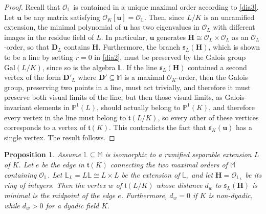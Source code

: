 \documentclass{amsart}
\newtheorem{proposition}[theorem]{Proposition}
\theoremstyle{definition}
\newcommand\lu{\mathbb{L}}
\newcommand\alge{\mathbb{M}}
\newcommand\oink{\mathcal O}
\newcommand\Da{\mathbf{D}}
\newcommand\Ha{\mathbf{H}}
\begin{document}
\begin{proof}
    Recall that $\oink_{\lu}$ is contained in
    a unique maximal order 
    according to \ref{dia3}.
    Let $\mathbf{u}$ be any matrix satisfying
    $\oink_K[\mathbf{u}]=
    \oink_{\lu}$. Then, since $L/K$
    is an unramified extension, 
    the minimal polynomial
    of $\mathbf{u}$ has two eigenvalues in 
    $\oink_L$ with different
    images in the residue field of 
    $L$. In particular,
    $\mathbf{u}$ generates 
    $\Ha\cong\oink_L\times\oink_L$ 
    as an $\oink_L$-order, 
    so that $\Da_L$ contains
    $\Ha$. Furthermore, the 
    branch $\mathfrak{s}_L(\Ha)$,
    which is shown to be a line by 
    setting $r=0$ in \ref{dia2},
    must be preserved by the Galois 
    group $\mathrm{Gal}(L/K)$,
    since so is the algebra $\lu$. If the line
    $\mathfrak{s}_L(\Ha)$ contained 
    a second vertex
    of the form
    $\Da'_L$ where $\Da'\subseteq\alge$ is a 
    maximal $\oink_K$-order, then the 
    Galois group, 
    preserving two points in a line, 
    must act trivially,
    and therefore it must preserve both
    visual limits of the line, but 
    then those visual limits, as 
    Galois-invariant elements 
    in $\mathbb{P}^1(L)$,
    should actually belong to $\mathbb{P}^1(K)$,
    and therefore every vertex in the line  must
    belong to $\mathfrak{t}(L/K)$, so every
    other of these vertices corresponds
    to a vertex of $\mathfrak{t}(K)$. 
    This contradicts the fact that 
    $\mathfrak{s}_K(\mathbf{u})$
    has a single vertex. The result follows.
\end{proof}

\begin{proposition}\label{p26}
    Assume $\lu\subseteq\alge $
    is isomorphic to a ramified
    separable extension $L$ of $K$.
    Let $e$ be the edge in $\mathfrak{t}(K)$
    connecting the two maximal orders of $\alge $
    containing $\oink_{\lu}$.
    Let $\lu_L=L\lu\cong L\times L$
    be the extension of $\lu$, and let 
    $\Ha=\oink_{\lu_L}$ be its ring of integers. 
    Then the vertex $w$ of $\mathfrak{t}(L/K)$ whose distance
    $d_w$ to $\mathfrak{s}_L(\Ha)$ is minimal
    is the midpoint of the edge $e$. 
    Furthermore, $d_w=0$ if $K$ is non-dyadic, while
    $d_w>0$ for a dyadic field $K$.
\end{proposition}
\end{document}
